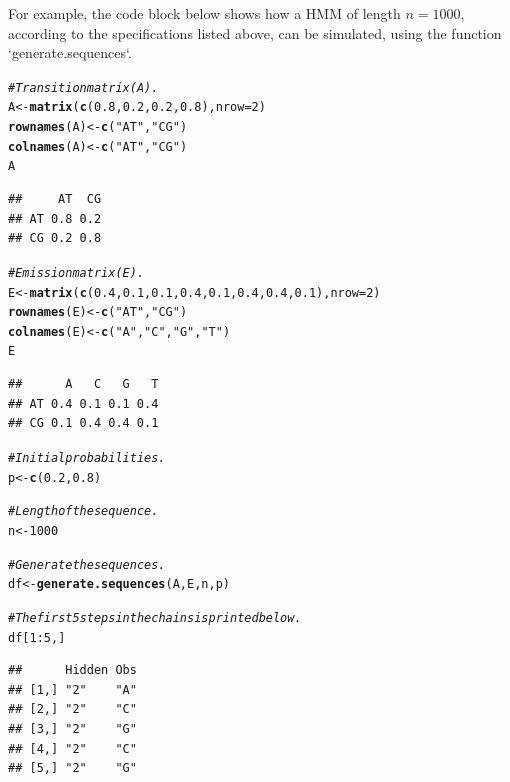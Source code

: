 \documentclass{article}\usepackage[]{graphicx}\usepackage[]{color}
\makeatletter
\newcommand{\hlnum}[1]{\textcolor[rgb]{0.686,0.059,0.569}{#1}}%
\newcommand{\hlstr}[1]{\textcolor[rgb]{0.192,0.494,0.8}{#1}}%
\newcommand{\hlcom}[1]{\textcolor[rgb]{0.678,0.584,0.686}{\textit{#1}}}%
\newcommand{\hlopt}[1]{\textcolor[rgb]{0,0,0}{#1}}%
\newcommand{\hlstd}[1]{\textcolor[rgb]{0.345,0.345,0.345}{#1}}%
\newcommand{\hlkwb}[1]{\textcolor[rgb]{0.69,0.353,0.396}{#1}}%
\newcommand{\hlkwc}[1]{\textcolor[rgb]{0.333,0.667,0.333}{#1}}%
\newcommand{\hlkwd}[1]{\textcolor[rgb]{0.737,0.353,0.396}{\textbf{#1}}}%
\newenvironment{kframe}{%
 \def\at@end@of@kframe{}%
 \ifinner\ifhmode%
  \def\at@end@of@kframe{\end{minipage}}%
  \begin{minipage}{\columnwidth}%
 \fi\fi%
 \def\FrameCommand##1{\hskip\@totalleftmargin \hskip-\fboxsep
 \colorbox{shadecolor}{##1}\hskip-\fboxsep
     \hskip-\linewidth \hskip-\@totalleftmargin \hskip\columnwidth}%
 \MakeFramed {\advance\hsize-\width
   \@totalleftmargin\z@ \linewidth\hsize
   \@setminipage}}%
 {\par\unskip\endMakeFramed%
 \at@end@of@kframe}
\newenvironment{knitrout}{}{} %
\makeatother
\begin{document}
For example, the code block below shows how a HMM of length $n = 1000$, according to the specifications listed above, can be simulated, using the function `generate.sequences`.

\begin{knitrout}
\color{fgcolor}\begin{kframe}
\begin{alltt}
\hlcom{# Transition matrix (A).}
\hlstd{A} \hlkwb{<-} \hlkwd{matrix}\hlstd{(}\hlkwd{c}\hlstd{(}\hlnum{0.8}\hlstd{,} \hlnum{0.2}\hlstd{,} \hlnum{0.2}\hlstd{,} \hlnum{0.8}\hlstd{),} \hlkwc{nrow} \hlstd{=} \hlnum{2}\hlstd{)}
\hlkwd{rownames}\hlstd{(A)} \hlkwb{<-} \hlkwd{c}\hlstd{(}\hlstr{"AT"}\hlstd{,} \hlstr{"CG"}\hlstd{)}
\hlkwd{colnames}\hlstd{(A)} \hlkwb{<-} \hlkwd{c}\hlstd{(}\hlstr{"AT"}\hlstd{,} \hlstr{"CG"}\hlstd{)}
\hlstd{A}
\end{alltt}
\begin{verbatim}
##     AT  CG
## AT 0.8 0.2
## CG 0.2 0.8
\end{verbatim}
\begin{alltt}
\hlcom{# Emission matrix (E).}
\hlstd{E} \hlkwb{<-} \hlkwd{matrix}\hlstd{(}\hlkwd{c}\hlstd{(}\hlnum{0.4}\hlstd{,} \hlnum{0.1}\hlstd{,} \hlnum{0.1}\hlstd{,} \hlnum{0.4}\hlstd{,} \hlnum{0.1}\hlstd{,} \hlnum{0.4}\hlstd{,} \hlnum{0.4}\hlstd{,} \hlnum{0.1}\hlstd{),} \hlkwc{nrow} \hlstd{=} \hlnum{2}\hlstd{)}
\hlkwd{rownames}\hlstd{(E)} \hlkwb{<-} \hlkwd{c}\hlstd{(}\hlstr{"AT"}\hlstd{,} \hlstr{"CG"}\hlstd{)}
\hlkwd{colnames}\hlstd{(E)} \hlkwb{<-} \hlkwd{c}\hlstd{(}\hlstr{"A"}\hlstd{,} \hlstr{"C"}\hlstd{,} \hlstr{"G"}\hlstd{,} \hlstr{"T"}\hlstd{)}
\hlstd{E}
\end{alltt}
\begin{verbatim}
##      A   C   G   T
## AT 0.4 0.1 0.1 0.4
## CG 0.1 0.4 0.4 0.1
\end{verbatim}
\begin{alltt}
\hlcom{# Initial probabilities.}
\hlstd{p} \hlkwb{<-} \hlkwd{c}\hlstd{(}\hlnum{0.2}\hlstd{,}\hlnum{0.8}\hlstd{)}

\hlcom{# Length of the sequence.}
\hlstd{n} \hlkwb{<-} \hlnum{1000}

\hlcom{# Generate the sequences. }
\hlstd{df} \hlkwb{<-} \hlkwd{generate.sequences}\hlstd{(A, E, n, p)}

\hlcom{# The first 5 steps in the chains is printed below. }
\hlstd{df[}\hlnum{1}\hlopt{:}\hlnum{5}\hlstd{, ]}
\end{alltt}
\begin{verbatim}
##      Hidden Obs
## [1,] "2"    "A"
## [2,] "2"    "C"
## [3,] "2"    "G"
## [4,] "2"    "C"
## [5,] "2"    "G"
\end{verbatim}
\end{kframe}
\end{knitrout}
\end{document}
